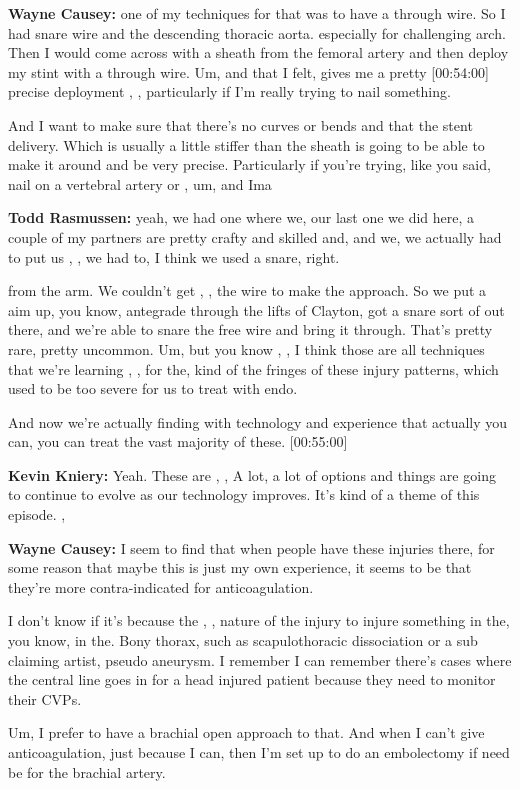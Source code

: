 \documentclass[
]{book}
\begin{document}
\textbf{Wayne Causey:} one of my techniques for that was to have a through
wire. So I had snare wire and the descending thoracic aorta. especially
for challenging arch. Then I would come across with a sheath from the
femoral artery and then deploy my stint with a through wire. Um, and
that I felt, gives me a pretty {[}00:54:00{]} precise deployment , ,
particularly if I'm really trying to nail something.

And I want to make sure that there's no curves or bends and that the
stent delivery. Which is usually a little stiffer than the sheath is
going to be able to make it around and be very precise. Particularly if
you're trying, like you said, nail on a vertebral artery or , um, and
Ima

\textbf{Todd Rasmussen:} yeah, we had one where we, our last one we did here,
a couple of my partners are pretty crafty and skilled and, and we, we
actually had to put us , , we had to, I think we used a snare, right.

from the arm. We couldn't get , , the wire to make the approach. So we
put a aim up, you know, antegrade through the lifts of Clayton, got a
snare sort of out there, and we're able to snare the free wire and bring
it through. That's pretty rare, pretty uncommon. Um, but you know , , I
think those are all techniques that we're learning , , for the, kind of
the fringes of these injury patterns, which used to be too severe for us
to treat with endo.

And now we're actually finding with technology and experience that
actually you can, you can treat the vast majority of these. {[}00:55:00{]}

\textbf{Kevin Kniery:} Yeah. These are , , A lot, a lot of options and things
are going to continue to evolve as our technology improves. It's kind of
a theme of this episode. ,

\textbf{Wayne Causey:} I seem to find that when people have these injuries
there, for some reason that maybe this is just my own experience, it
seems to be that they're more contra-indicated for anticoagulation.

I don't know if it's because the , , nature of the injury to injure
something in the, you know, in the. Bony thorax, such as scapulothoracic
dissociation or a sub claiming artist, pseudo aneurysm. I remember I can
remember there's cases where the central line goes in for a head injured
patient because they need to monitor their CVPs.

Um, I prefer to have a brachial open approach to that. And when I can't
give anticoagulation, just because I can, then I'm set up to do an
embolectomy if need be for the brachial artery.
\end{document}
